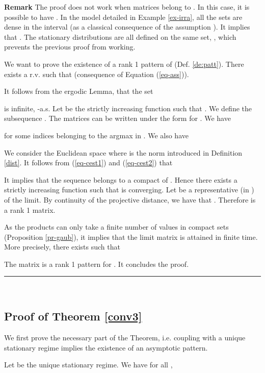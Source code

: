 \documentclass[11pt,titlepage]{article}
\def\eref#1{(\ref{#1})}
\newcommand{\parag}{\medskip\noindent}
\newcommand{\cqfd}{\hspace*{\fill}\rule{1.8mm}{1.8mm} \\ }
\begin{document}
{\bf Remark } The proof does not work 
when matrices  belong to . 
In this 
case, it is possible to have .  
In the model detailed in Example \ref{ex-irra},
all the sets  are dense in the interval 
(as a classical consequence of the assumption ). 
It implies that .
The stationary distributions  are all defined on the same set, ,
which prevents the previous proof from working. 

\parag

We want to prove the existence of a rank 1 pattern of  
(Def. \ref{de:patt}).
There exists a r.v.  such that 
 (consequence
of Equation \eref{eq-ass}). 

It follows from the ergodic Lemma, that the set

is infinite, -a.s. Let  be the strictly increasing
function such that . We define the 
subsequence . 
The matrices  can be written under the 
form  for . We have

for some indices   belonging to the argmax in .
We also have

We consider the Euclidean space  where 
is the norm introduced in Definition \ref{dist}. It follows from \eref{eq-cest1} and \eref{eq-cest2} that

It implies that the sequence  belongs to a compact 
of . Hence there exists a strictly increasing
function  such that 
is converging. Let  be a representative (in )
of the limit. 
By 
continuity of the projective distance, we have that . Therefore  is a 
rank 1 matrix. 

\parag
As the products  
can only take a finite number of values in compact sets
(Proposition \ref{pr-gaub}),
it implies  that 
the limit matrix 
is attained in finite time. More precisely, there exists  such that

The matrix  is a rank 1 pattern
for . It concludes the proof.
\cqfd










\subsection{Proof of Theorem \protect\ref{conv3} } 
\label{app:conv3}
We first prove the necessary part of the Theorem, i.e. coupling
with a unique stationary regime implies the existence of an 
asymptotic pattern.

Let  be the unique stationary regime. We have for all
,
\end{document}
